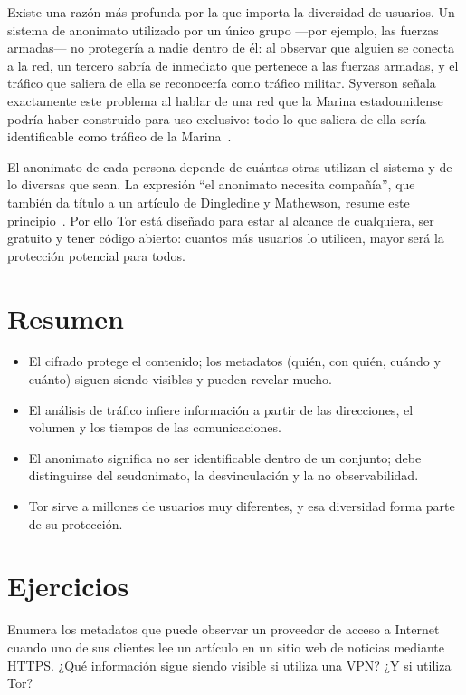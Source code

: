 Existe una razón más profunda por la que importa la diversidad de usuarios. Un sistema de anonimato utilizado por un único grupo ---por ejemplo, las fuerzas armadas--- no protegería a nadie dentro de él: al observar que alguien se conecta a la red, un tercero sabría de inmediato que pertenece a las fuerzas armadas, y el tráfico que saliera de ella se reconocería como tráfico militar. Syverson señala exactamente este problema al hablar de una red que la Marina estadounidense podría haber construido para uso exclusivo: todo lo que saliera de ella sería identificable como tráfico de la Marina~\cite{syverson2011peel}.

El anonimato de cada persona depende de cuántas otras utilizan el sistema y de lo diversas que sean. La expresión \enquote{el anonimato necesita compañía}, que también da título a un artículo de Dingledine y Mathewson, resume este principio~\cite{dingledine2006company}. Por ello Tor está diseñado para estar al alcance de cualquiera, ser gratuito y tener código abierto: cuantos más usuarios lo utilicen, mayor será la protección potencial para todos.

\section*{Resumen}
\begin{itemize}
  \item El cifrado protege el contenido; los metadatos (quién, con quién, cuándo y cuánto) siguen siendo visibles y pueden revelar mucho.
  \item El análisis de tráfico infiere información a partir de las direcciones, el volumen y los tiempos de las comunicaciones.
  \item El anonimato significa no ser identificable dentro de un conjunto; debe distinguirse del seudonimato, la desvinculación y la no observabilidad.
  \item Tor sirve a millones de usuarios muy diferentes, y esa diversidad forma parte de su protección.
\end{itemize}

\section*{Ejercicios}

\begin{esercizio}[1]\label{es:01-metadati}
Enumera los metadatos que puede observar un proveedor de acceso a Internet cuando uno de sus clientes lee un artículo en un sitio web de noticias mediante HTTPS. ¿Qué información sigue siendo visible si utiliza una VPN? ¿Y si utiliza Tor?
\end{esercizio}

